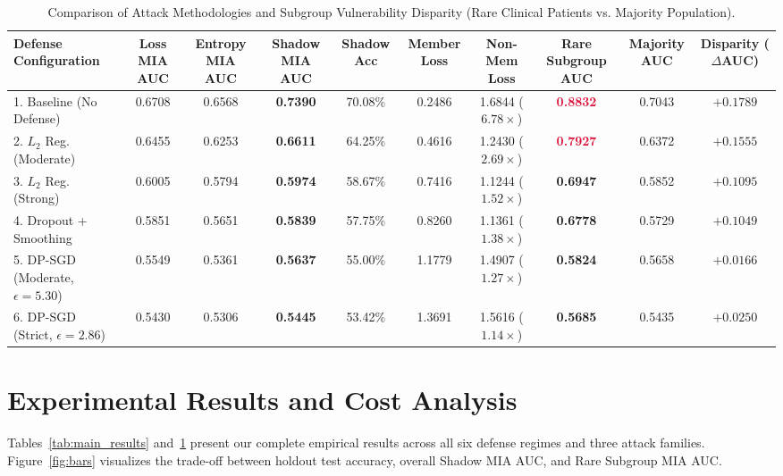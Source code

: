 \documentclass[10pt,twocolumn]{article}
\begin{document}
\begin{table}[t]
\centering
\caption{Comparison of Attack Methodologies and Subgroup Vulnerability Disparity (Rare Clinical Patients vs. Majority Population).}
\label{tab:subgroup}
\renewcommand{\arraystretch}{1.12}
\setlength{\tabcolsep}{5.2pt}
\footnotesize
\begin{tabular}{lccccccccc}
\toprule
\textbf{Defense Configuration} & \textbf{Loss MIA AUC} & \textbf{Entropy MIA AUC} & \textbf{Shadow MIA AUC} & \textbf{Shadow Acc} & \textbf{Member Loss} & \textbf{Non-Mem Loss} & \textbf{Rare Subgroup AUC} & \textbf{Majority AUC} & \textbf{Disparity ($\Delta$AUC)} \\
\midrule
1. Baseline (No Defense) & 0.6708 & 0.6568 & \textbf{0.7390} & 70.08\% & 0.2486 & 1.6844 ($6.78\times$) & \textcolor{crimson}{\textbf{0.8832}} & 0.7043 & $+0.1789$ \\
2. $L_2$ Reg. (Moderate) & 0.6455 & 0.6253 & \textbf{0.6611} & 64.25\% & 0.4616 & 1.2430 ($2.69\times$) & \textcolor{crimson}{\textbf{0.7927}} & 0.6372 & $+0.1555$ \\
3. $L_2$ Reg. (Strong) & 0.6005 & 0.5794 & \textbf{0.5974} & 58.67\% & 0.7416 & 1.1244 ($1.52\times$) & \textbf{0.6947} & 0.5852 & $+0.1095$ \\
4. Dropout + Smoothing & 0.5851 & 0.5651 & \textbf{0.5839} & 57.75\% & 0.8260 & 1.1361 ($1.38\times$) & \textbf{0.6778} & 0.5729 & $+0.1049$ \\
5. DP-SGD (Moderate, $\epsilon=5.30$) & 0.5549 & 0.5361 & \textbf{0.5637} & 55.00\% & 1.1779 & 1.4907 ($1.27\times$) & \textcolor{tealblue}{\textbf{0.5824}} & 0.5658 & \textbf{$+0.0166$} \\
6. DP-SGD (Strict, $\epsilon=2.86$) & 0.5430 & 0.5306 & \textbf{0.5445} & 53.42\% & 1.3691 & 1.5616 ($1.14\times$) & \textcolor{tealblue}{\textbf{0.5685}} & 0.5435 & \textbf{$+0.0250$} \\
\bottomrule
\end{tabular}
\end{table}

\section{Experimental Results and Cost Analysis}
Tables~\ref{tab:main_results} and~\ref{tab:subgroup} present our complete empirical results across all six defense regimes and three attack families. Figure~\ref{fig:bars} visualizes the trade-off between holdout test accuracy, overall Shadow MIA AUC, and Rare Subgroup MIA AUC.
\end{document}
